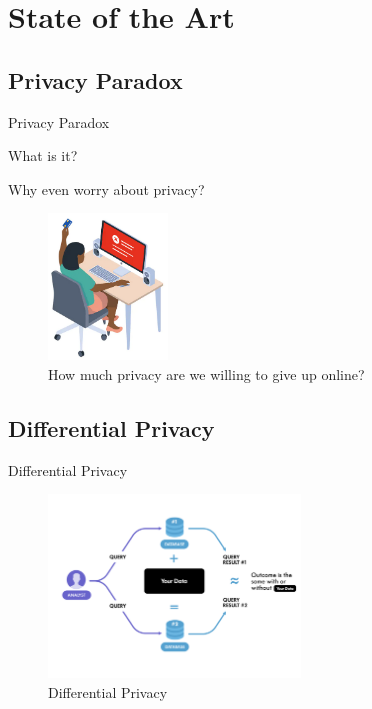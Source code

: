 \documentclass[xcolor={svgnames},aspectratio=169]{beamer}
\begin{document}
\section{State of the Art}

\subsection{Privacy Paradox}

\begin{frame}{Privacy Paradox}
    \begin{multicols}{2}
        \vspace*{\fill}
        What is it?

        \vspace*{\fill}
        Why even worry about privacy?
        \vspace*{\fill}

        \columnbreak
        \begin{figure}
            \centering\includegraphics[width=90pt]{assets/images/privacy_paradox.png}
            \caption{How much privacy are we willing to give up online? \cite{ClareParadox}}
        \end{figure}
    \end{multicols}
\end{frame}

\subsection{Differential Privacy}

\begin{frame}{Differential Privacy}
    \begin{figure}
        \centering\includegraphics[width=190pt]{assets/images/dp.png}
        \caption{Differential Privacy \cite{WintonDifferential}}
    \end{figure}
\end{frame}
\end{document}
